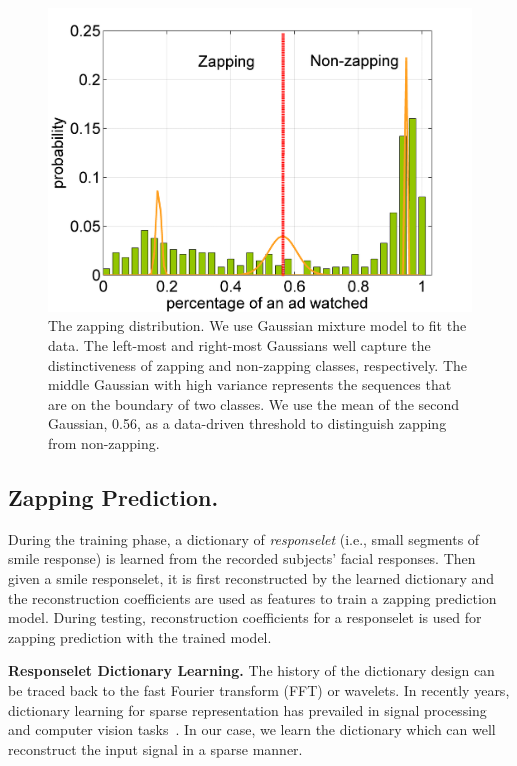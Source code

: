 \documentclass[twoside,leqno,twocolumn]{article}
\begin{document}
\begin{figure}[h]
	\centering
		\includegraphics[width=.9\columnwidth]{fig/ad_len_distr.png}
	\caption{The zapping distribution. We use Gaussian mixture model to fit the data. The left-most and right-most Gaussians well capture the distinctiveness of zapping and non-zapping classes, respectively. The middle Gaussian with high variance represents the sequences that are on the boundary of two classes. We use the mean of the second Gaussian, 0.56, as a data-driven threshold to distinguish zapping from non-zapping.}
	\label{fig:ad_len_distr}
\end{figure}

\subsection{Zapping Prediction.}

During the training phase, a dictionary of \textit{responselet} (i.e., small segments of smile response) is learned from the recorded subjects' facial responses. Then given a smile responselet, it is first reconstructed by the learned dictionary and the reconstruction coefficients are used as features to train a zapping prediction model. During testing, reconstruction coefficients for a responselet is used for zapping prediction with the trained model. 

\noindent \textbf{Responselet Dictionary Learning.} The history of the dictionary design can be traced back to the fast Fourier transform (FFT) or wavelets. In recently years, dictionary learning for sparse representation has prevailed in signal processing and computer vision tasks~\cite{spams}. In our case, we learn the dictionary which can well reconstruct the input signal in a sparse manner. 
\end{document}
